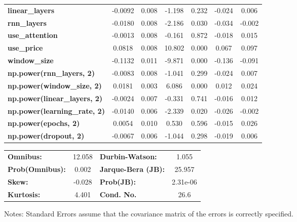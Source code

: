 \begin{center}
\begin{tabular}{lcccccc}
\textbf{linear\_layers}              &      -0.0092  &        0.008     &    -1.198  &         0.232        &       -0.024    &        0.006     \\
\textbf{rnn\_layers}                 &      -0.0180  &        0.008     &    -2.186  &         0.030        &       -0.034    &       -0.002     \\
\textbf{use\_attention}              &      -0.0013  &        0.008     &    -0.161  &         0.872        &       -0.018    &        0.015     \\
\textbf{use\_price}                  &       0.0818  &        0.008     &    10.802  &         0.000        &        0.067    &        0.097     \\
\textbf{window\_size}                &      -0.1132  &        0.011     &    -9.871  &         0.000        &       -0.136    &       -0.091     \\
\textbf{np.power(rnn\_layers, 2)}    &      -0.0083  &        0.008     &    -1.041  &         0.299        &       -0.024    &        0.007     \\
\textbf{np.power(window\_size, 2)}   &       0.0181  &        0.003     &     6.086  &         0.000        &        0.012    &        0.024     \\
\textbf{np.power(linear\_layers, 2)} &      -0.0024  &        0.007     &    -0.331  &         0.741        &       -0.016    &        0.012     \\
\textbf{np.power(learning\_rate, 2)} &      -0.0140  &        0.006     &    -2.339  &         0.020        &       -0.026    &       -0.002     \\
\textbf{np.power(epochs, 2)}         &       0.0054  &        0.010     &     0.530  &         0.596        &       -0.015    &        0.026     \\
\textbf{np.power(dropout, 2)}        &      -0.0067  &        0.006     &    -1.044  &         0.298        &       -0.019    &        0.006     \\
\bottomrule
\end{tabular}
\begin{tabular}{lclc}
\textbf{Omnibus:}       & 12.058 & \textbf{  Durbin-Watson:     } &    1.055  \\
\textbf{Prob(Omnibus):} &  0.002 & \textbf{  Jarque-Bera (JB):  } &   25.957  \\
\textbf{Skew:}          & -0.028 & \textbf{  Prob(JB):          } & 2.31e-06  \\
\textbf{Kurtosis:}      &  4.401 & \textbf{  Cond. No.          } &     26.6  \\
\bottomrule
\end{tabular}
\end{center}

Notes: \newline
 [1] Standard Errors assume that the covariance matrix of the errors is correctly specified.